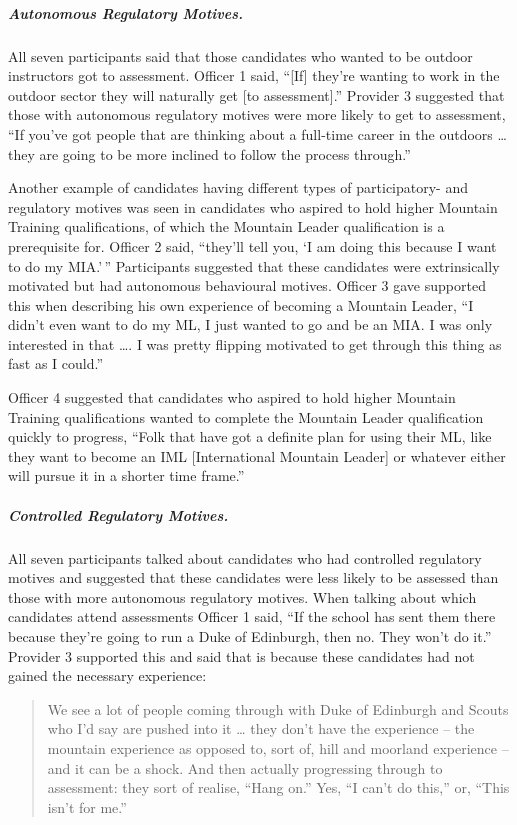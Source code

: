 \documentclass[
  12pt,
  a4paper,
]{book}
\begin{document}
\hypertarget{autonomous-regulatory-motives.}{%
\subparagraph{Autonomous Regulatory Motives.}\label{autonomous-regulatory-motives.}}

All seven participants said that those candidates who wanted to be outdoor instructors got to assessment. Officer 1 said, ``{[}If{]} they're wanting to work in the outdoor sector they will naturally get {[}to assessment{]}.'' Provider 3 suggested that those with autonomous regulatory motives were more likely to get to assessment, ``If you've got people that are thinking about a full-time career in the outdoors \ldots{} they are going to be more inclined to follow the process through.''

Another example of candidates having different types of participatory- and regulatory motives was seen in candidates who aspired to hold higher Mountain Training qualifications, of which the Mountain Leader qualification is a prerequisite for. Officer 2 said, ``they'll tell you, `I am doing this because I want to do my MIA.'\,'' Participants suggested that these candidates were extrinsically motivated but had autonomous behavioural motives. Officer 3 gave supported this when describing his own experience of becoming a Mountain Leader, ``I didn't even want to do my ML, I just wanted to go and be an MIA. I was only interested in that \ldots. I was pretty flipping motivated to get through this thing as fast as I could.''

Officer 4 suggested that candidates who aspired to hold higher Mountain Training qualifications wanted to complete the Mountain Leader qualification quickly to progress, ``Folk that have got a definite plan for using their ML, like they want to become an IML {[}International Mountain Leader{]} or whatever either will pursue it in a shorter time frame.''

\hypertarget{controlled-regulatory-motives.}{%
\subparagraph{Controlled Regulatory Motives.}\label{controlled-regulatory-motives.}}

All seven participants talked about candidates who had controlled regulatory motives and suggested that these candidates were less likely to be assessed than those with more autonomous regulatory motives. When talking about which candidates attend assessments Officer 1 said, ``If the school has sent them there because they're going to run a Duke of Edinburgh, then no. They won't do it.'' Provider 3 supported this and said that is because these candidates had not gained the necessary experience:

\begin{quote}
We see a lot of people coming through with Duke of Edinburgh and Scouts who I'd say are pushed into it \ldots{} they don't have the experience -- the mountain experience as opposed to, sort of, hill and moorland experience -- and it can be a shock. And then actually progressing through to assessment: they sort of realise, ``Hang on.'' Yes, ``I can't do this,'' or, ``This isn't for me.''
\end{quote}
\end{document}
